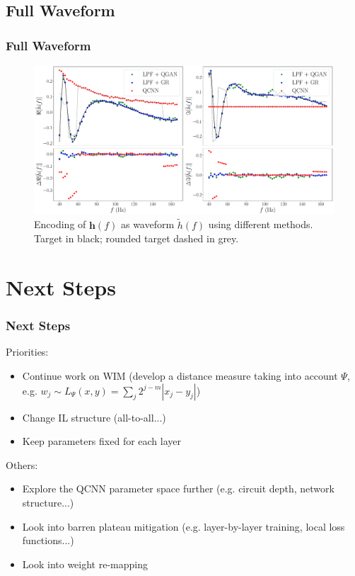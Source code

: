 \documentclass{beamer}
\begin{document}
\subsection{Full Waveform}
\begin{frame}
\frametitle{Full Waveform}
\begin{figure}[h]
\centering
\includegraphics[width=\textwidth]{im/h_comp}
\caption{Encoding of $\boldsymbol{h}(f)$ as waveform $\tilde{h}(f)$ using different methods. Target in black; rounded target dashed in grey.}
\end{figure}
\end{frame}

\section{Next Steps}
\begin{frame}
\frametitle{Next Steps}
\alert{Priorities:}
\begin{itemize}
\item Continue work on WIM (develop a distance measure taking into account $\Psi$, e.g. $w_j \sim L_\Psi (x,y)=\sum_j 2^{j-m} |x_j -y_j|$) 
\item Change IL structure (all-to-all...)
\item Keep parameters fixed for each layer
\end{itemize}
Others:
\begin{itemize}
\item Explore the QCNN parameter space further (e.g. circuit depth, network structure...) 
\item Look into barren plateau mitigation (e.g. layer-by-layer training, local loss functions...)
\item Look into weight re-mapping
\end{itemize}
\end{frame}
\end{document}
